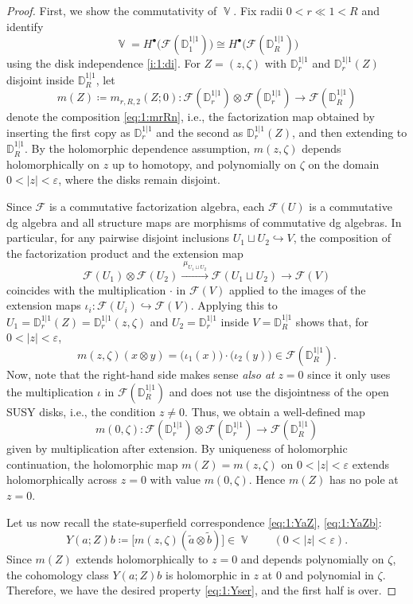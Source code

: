 \documentclass[final,reqno]{amsart}
\numberwithin{equation}{section}
\theoremstyle{definition}
\newcommand{\bl}{\bullet}
\newcommand{\ve}{\varepsilon}
\newcommand{\wt}{\widetilde}
\newcommand{\ceq}{\coloneqq} %
\newcommand{\xrr}[1]{\xrightarrow{\ #1 \ }{}}
\newcommand{\inj}{\hookrightarrow}
\newcommand{\lto}{\longrightarrow}
\newcommand{\sD}{\mathbb{D}^{1|1}}
\newcommand{\clF}{\mathcal{F}}
\newcommand{\abs}[1]{\left| #1 \right|}
\DeclareMathOperator{\bbV}{\mathbb{V}}
\begin{document}
\begin{proof}
First, we show the commutativity of $\bbV$.
Fix radii $0<r\ll 1<R$ and identify
\[
 \bbV = H^{\bl}\!\bigl(\clF(\sD_1)\bigr)\cong H^{\bl}\!\bigl(\clF(\sD_R)\bigr)
\]
using the disk independence \ref{i:1:di}.
For $Z=(z,\zeta)$ with $\sD_r$ and $\sD_r(Z)$ 
disjoint inside $\sD_R$, let
\[
 m(Z) \ceq m_{r,R,2}(Z;0)\colon 
 \clF(\sD_r) \otimes \clF(\sD_r) \lto \clF(\sD_R)
\]
denote the composition \eqref{eq:1:mrRn}, i.e., 
the factorization map obtained by inserting the first copy as $\sD_r$ 
and the second as $\sD_r(Z)$, and then extending to $\sD_R$.
By the holomorphic dependence assumption, 
$m(z,\zeta)$ depends holomorphically on $z$ up to homotopy, 
and polynomially on $\zeta$ on the domain $0<\abs{z}<\ve$, 
where the disks remain disjoint.

Since $\clF$ is a commutative factorization algebra, 
each $\clF(U)$ is a commutative dg algebra and
all structure maps are morphisms of commutative dg algebras. 
In particular, for any pairwise disjoint inclusions $U_1 \sqcup U_2 \inj V$,
the composition of the factorization product and the extension map
\[
 \clF(U_1) \otimes \clF(U_2) \xrr{\mu_{U_1 \sqcup U_2}} 
 \clF(U_1\sqcup U_2) \lto \clF(V)
\]
coincides with the multiplication $\cdot$ in $\clF(V)$ applied to 
the images of the extension maps $\iota_i\colon \clF(U_i) \inj \clF(V)$.
Applying this to $U_1=\sD_r(Z)=\sD_r(z,\zeta)$ and $U_2=\sD_r$ inside $V=\sD_R$
shows that, for $0<|z|<\ve$,
\[
 m(z,\zeta)(x \otimes y) = 
 \bigl(\iota_1(x)\bigr) \cdot \bigl(\iota_2(y)\bigr) \in \clF(\sD_R).
\]
Now, note that the right-hand side makes sense \emph{also at} $z=0$
since it only uses the multiplication $\iota$ in $\clF(\sD_R)$ 
and does not use the disjointness of the open SUSY disks, i.e.,
the condition $z \ne 0$.
Thus, we obtain a well-defined map
\[
 m(0,\zeta)\colon \clF(\sD_r) \otimes \clF(\sD_r) \lto \clF(\sD_R)
\]
given by multiplication after extension.
By uniqueness of holomorphic continuation, 
the holomorphic map $m(Z)=m(z,\zeta)$ on $0<|z|<\ve$ extends 
holomorphically across $z=0$ with value $m(0,\zeta)$. 
Hence $m(Z)$ has no pole at $z=0$.

Let us now recall the state-superfield correspondence 
\eqref{eq:1:YaZ}, \eqref{eq:1:YaZb}: 
\[
 Y(a;Z)b \ceq \bigl[m(z,\zeta)(\wt{a} \otimes \wt{b})\bigr] \in \bbV
 \qquad (0<|z|<\ve).
\]
Since $m(Z)$ extends holomorphically to $z=0$ 
and depends polynomially on $\zeta$,
the cohomology class $Y(a;Z)b$ is holomorphic in $z$ at $0$ 
and polynomial in $\zeta$.
Therefore, we have the desired property \eqref{eq:1:Yser},
and the first half is over. 


\end{proof}
\end{document}
